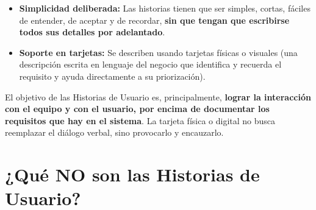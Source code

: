 \begin{center}
\end{center}

\begin{itemize}[itemsep=3pt]
    \item \textbf{Simplicidad deliberada:} Las historias tienen que ser simples, cortas, fáciles de entender, de aceptar y de recordar, \textbf{sin que tengan que escribirse todos sus detalles por adelantado}.
    \item \textbf{Soporte en tarjetas:} Se describen usando tarjetas físicas o visuales (una descripción escrita en lenguaje del negocio que identifica y recuerda el requisito y ayuda directamente a su priorización).
\end{itemize}

\begin{aviso}
El objetivo de las Historias de Usuario es, principalmente, \textbf{lograr la interacción con el equipo y con el usuario, por encima de documentar los requisitos que hay en el sistema}. La tarjeta física o digital no busca reemplazar el diálogo verbal, sino provocarlo y encauzarlo.
\end{aviso}

\section{¿Qué NO son las Historias de Usuario?}

